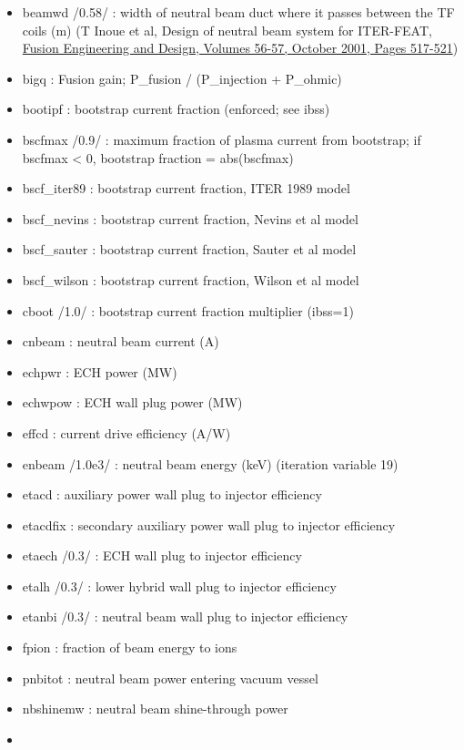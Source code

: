 \documentclass[]{article}
\providecommand{\tightlist}{%
  \setlength{\itemsep}{0pt}\setlength{\parskip}{0pt}}
\begin{document}
\begin{itemize}
\tightlist
\item
  beamwd /0.58/ : width of neutral beam duct where it passes between the
  TF coils (m) (T Inoue et al, Design of neutral beam system for
  ITER-FEAT,
  \href{http://dx.doi.org/10.1016/S0920-3796(01)00339-8}{Fusion
  Engineering and Design, Volumes 56-57, October 2001, Pages 517-521})
\item
  bigq : Fusion gain; P\_fusion / (P\_injection + P\_ohmic)
\item
  bootipf : bootstrap current fraction (enforced; see ibss)
\item
  bscfmax /0.9/ : maximum fraction of plasma current from bootstrap; if
  bscfmax \textless{} 0, bootstrap fraction = abs(bscfmax)
\item
  bscf\_iter89 : bootstrap current fraction, ITER 1989 model
\item
  bscf\_nevins : bootstrap current fraction, Nevins et al model
\item
  bscf\_sauter : bootstrap current fraction, Sauter et al model
\item
  bscf\_wilson : bootstrap current fraction, Wilson et al model
\item
  cboot /1.0/ : bootstrap current fraction multiplier (ibss=1)
\item
  cnbeam : neutral beam current (A)
\item
  echpwr : ECH power (MW)
\item
  echwpow : ECH wall plug power (MW)
\item
  effcd : current drive efficiency (A/W)
\item
  enbeam /1.0e3/ : neutral beam energy (keV) (iteration variable 19)
\item
  etacd : auxiliary power wall plug to injector efficiency
\item
  etacdfix : secondary auxiliary power wall plug to injector efficiency
\item
  etaech /0.3/ : ECH wall plug to injector efficiency
\item
  etalh /0.3/ : lower hybrid wall plug to injector efficiency
\item
  etanbi /0.3/ : neutral beam wall plug to injector efficiency
\item
  fpion : fraction of beam energy to ions
\item
  pnbitot : neutral beam power entering vacuum vessel
\item
  nbshinemw : neutral beam shine-through power
\item

\end{itemize}
\end{document}
